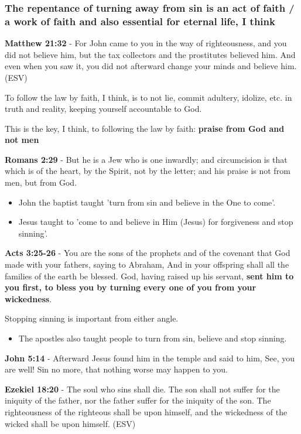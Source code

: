 \documentclass[11pt]{article}
\begin{document}
\subsubsection{The repentance of turning away from sin is an act of faith / a work of faith and also essential for eternal life, I think}
\label{sec:org5549131}
\textbf{Matthew 21:32} - For John came to you in the way of righteousness, and you did not believe him, but the tax collectors and the prostitutes believed him. And even when you saw it, you did not afterward change your minds and believe him. (ESV)

To follow the law by faith, I think, is to not lie, commit adultery, idolize, etc. in truth and reality, keeping yourself accountable to God.

This is the key, I think, to following the law by faith: \textbf{praise from God and not men}

\textbf{Romans 2:29} - But he is a Jew who is one inwardly; and circumcision is that which is of the heart, by the Spirit, not by the letter; and his praise is not from men, but from God.

\begin{itemize}
\item John the baptist taught 'turn from sin and believe in the One to come'.
\item Jesus taught to 'come to and believe in Him (Jesus) for forgiveness and stop sinning'.
\end{itemize}

\textbf{Acts 3:25-26} - You are the sons of the prophets and of the covenant that God made with your fathers, saying to Abraham, And in your offspring shall all the families of the earth be blessed. God, having raised up his servant, \textbf{sent him to you first, to bless you by turning every one of you from your wickedness}.

Stopping sinning is important from either angle.

\begin{itemize}
\item The apostles also taught people to turn from sin, believe and stop sinning.
\end{itemize}

\textbf{John 5:14} - Afterward Jesus found him in the temple and said to him, See, you are well! Sin no more, that nothing worse may happen to you.

\textbf{Ezekiel 18:20} - The soul who sins shall die.  The son shall not suffer for the iniquity of the father, nor the father suffer for the iniquity of the son.  The righteousness of the righteous shall be upon himself, and the wickedness of the wicked shall be upon himself.  (ESV)
\end{document}
